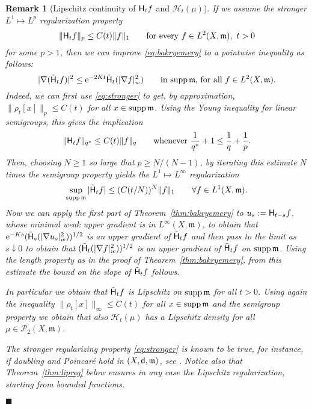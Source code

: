 \documentclass[reqno,11pt]{article}
\numberwithin{equation}{section}
\newcommand{\C}{\mathbb{C}}
\newcommand{\mm}{{\mbox{\boldmath$m$}}}
\newcommand{\sfd}{{\sf d}}
\newcommand{\rme}{{\mathrm e}}
\newcommand{\supp}{\mathop{\rm supp}\nolimits}   %
\newcommand{\forevery}{\text{for every }}
\newcommand{\ProbabilitiesTwo}[1]{\mathscr P_2(#1)}     %
\newtheorem{remark}[theorem]{Remark}
\newcommand{\probt}{\ProbabilitiesTwo}
\newcommand{\fr}{\hfill$\blacksquare$}                      %
\newcommand{\weakgrad}[1]{|\nabla #1|_w}                %
\renewcommand{\C}{{\rm Ch}}
\newcommand{\heatl}{{\sf H}}
\newcommand{\heatw}{{\mathscr H}}
\newcommand{\ked}[2]{\rho_{#2}[#1]}\renewcommand{\C}{{\sf Ch}}
\renewcommand{\mm}{\mathfrak m}
\begin{document}
\begin{remark}[Lipschitz continuity of $\heatl_tf$ and $\heatw_t(\mu)$]
{\rm If we assume the stronger $L^1\mapsto L^p$ regularization
property
\begin{equation}\label{eq:stronger}
\|\heatl_t f\|_p \leq C(t)\|f\|_1\qquad\forevery f\in
L^2(X,\mm),\,\,t>0
\end{equation}
for some $p>1$, then we can improve \eqref{eq:bakryemery} to a
pointwise inequality as follows:
$$
|\nabla (\tilde\heatl_t f)|^2\leq
\rme^{-2Kt}\tilde\heatl_t(\weakgrad{f}^2)\qquad\text{in $\supp\mm$,
for all $f\in L^2(X,\mm)$.}
$$
Indeed, we can first use \eqref{eq:stronger} to get, by
approximation, $\|\ked xt\|_p\leq C(t)$ for all $x\in\supp\mm$.
Using the Young inequality for linear semigroups, this gives the
implication
$$
\Vert \heatl_t f\Vert_{q^*}\leq C(t)\|f\|_q\qquad\text{whenever
$\frac{1}{q^*}+1\leq\frac{1}{q}+\frac{1}{p}$.}
$$
Then, choosing $N\geq 1$ so large that $p\geq N/(N-1)$, by iterating
this estimate $N$ times the semigroup property yields the
$L^1\mapsto L^\infty$ regularization
\begin{equation}\label{eq:stronger1}
\sup_{\supp\mm}|\tilde\heatl_t f| \leq
(C(t/N))^N\|f\|_1\qquad\forall f\in L^1(X,\mm).
\end{equation}
Now we can apply the first part of Theorem~\ref{thm:bakryemery} to
$u_s:=\heatl_{t-s}f$, whose minimal weak upper gradient is in
$L^\infty(X,\mm)$, to obtain that
$\rme^{-Ks}(\tilde\heatl_s(\weakgrad{{u_s}}^2))^{1/2}$ is an upper
gradient of $\tilde\heatl_tf$ and then pass to the limit as
$s\downarrow 0$ to obtain that
$(\tilde\heatl_t(\weakgrad{f}^2))^{1/2}$ is an upper gradient of
$\tilde\heatl_tf$ on $\supp\mm$. Using the length property as in the
proof of Theorem~\ref{thm:bakryemery}, from this estimate the bound
on the slope of $\tilde\heatl_t f$ follows.

In particular we obtain that $\tilde\heatl_t f$ is Lipschitz on
$\supp\mm$ for all $t>0$. Using again the inequality $\|\ked
xt\|_\infty\leq C(t)$ for all $x\in\supp\mm$ and the semigroup
property we obtain that also $\heatw_t(\mu)$ has a Lipschitz density
for all $\mu\in\probt{X,\mm}$.

The stronger regularizing property \eqref{eq:stronger} is known to
be true, for instance, if doubling and Poincar\'e hold in
$(X,\sfd,\mm)$, see \cite[Corollary~4.2]{Sturm96}. Notice also that
Theorem~\ref{thm:lipreg} below ensures in any case the Lipschitz
regularization, starting from bounded functions.}\fr
\end{remark}
\end{document}
